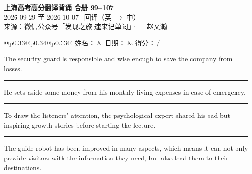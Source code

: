 \documentclass[11pt,a4paper]{article}
\newcommand{\num}[1]{\makebox[1.9em][r]{#1.}\hspace{0.3em}}
\newcommand{\wline}{\noindent\rule{\linewidth}{0.4pt}}
\begin{document}
\pagestyle{plain}
\begin{center}
{\LARGE\bfseries 上海高考高分翻译背诵 \quad 合册 99–107}\\[0.25em]
{\large 2026-09-29 至 2026-10-07 \quad\ 回译（英 $\to$ 中）}\\[0.35em]
{\footnotesize 来源：微信公众号「发现之旅 速来记单词」·  · 赵文瀚}
\end{center}

\vspace{0.4em}
\noindent\begin{tabular}{@{}p{0.33\textwidth}@{}p{0.34\textwidth}@{}p{0.33\textwidth}@{}}
姓名：\underline{\hspace{2.0cm}} & 日期：\underline{\hspace{2.0cm}} & 得分：\underline{\hspace{1.4cm}}\,/ \\
\end{tabular}

\vspace{0.5em}

\vspace{0.8em}
\vspace{0.35em}\vspace{0.15em}

\num{1}The security guard is responsible and wise enough to save the company from losses.

\vspace{0.25em}

\wline

\num{2}He sets  aside some money from his monthly living expenses in case of emergency.

\vspace{0.25em}

\wline

\num{3}To draw the listeners’ attention, the psychological expert shared his sad but inspiring growth stories before starting the lecture.

\vspace{0.25em}

\wline

\num{4}The guide robot has been improved in many aspects, which means it can not only provide visitors with the information they need, but also lead them to their destinations.

\vspace{0.25em}
\end{document}
